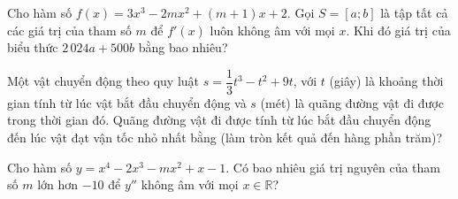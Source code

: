 \begin{ex}%
Cho hàm số $f(x)=3x^3-2mx^2+\left(m+1\right)x+2$. Gọi $S=\left[a; b\right]$ là tập tất cả các giá trị của tham số $m$ để $f'(x)$ luôn không âm với mọi $x$. Khi đó giá trị của biểu thức $2\,024a+500b$ bằng bao nhiêu?
\end{ex}

\begin{ex}%
Một vật chuyển động theo quy luật $s=\dfrac{1}{3} t^3-t^2+9t$, với $t$ (giây) là khoảng thời gian tính từ lúc vật bắt đầu chuyển động và $s$ (mét) là quãng đường vật đi được trong thời gian đó. Quãng đường vật đi được tính từ lúc bắt đầu chuyển động đến lúc vật đạt vận tốc nhỏ nhất bằng (làm tròn kết quả đến hàng phần trăm)?
\end{ex}

\begin{ex}%
Cho hàm số $y=x^4-2x^3-mx^2+x-1$. Có bao nhiêu giá trị nguyên của tham số $m$ lớn hơn $-10$ để $y''$ không âm với mọi $x \in \mathbb{R}$?
\end{ex}

